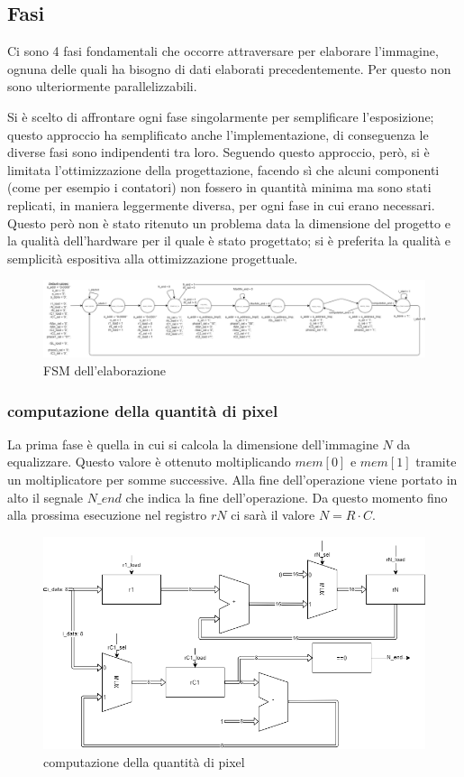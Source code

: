 \documentclass[11pt]{article} %
\begin{document}
\subsection{Fasi}
Ci sono 4 fasi fondamentali che occorre attraversare per elaborare l'immagine, ognuna delle quali ha bisogno di dati elaborati precedentemente. Per questo non sono ulteriormente parallelizzabili.

Si è scelto di affrontare ogni fase singolarmente per semplificare l'esposizione; questo approccio ha semplificato anche l'implementazione, di conseguenza le diverse fasi sono indipendenti tra loro. Seguendo questo approccio, però, si è limitata l'ottimizzazione della progettazione, facendo sì che alcuni componenti (come per esempio i contatori) non fossero in quantità minima ma sono stati replicati, in maniera leggermente diversa, per ogni fase in cui erano necessari. Questo però non è stato ritenuto un problema data la dimensione del progetto e la qualità dell'hardware per il quale è stato progettato; si è preferita la qualità e semplicità espositiva alla ottimizzazione progettuale.

\begin{figure}[h]
\centering
\includegraphics[width=150mm]{datapaths/FSM.png}
\caption{FSM dell'elaborazione}
\end{figure}

\subsubsection{computazione della quantità di pixel}
La prima fase è quella in cui si calcola la dimensione dell'immagine $N$ da equalizzare. Questo valore è ottenuto moltiplicando $mem[0]$ e $mem[1]$ tramite un moltiplicatore per somme successive. Alla fine dell'operazione viene portato in alto il segnale $N\_end$ che indica la fine dell'operazione. Da questo momento fino alla prossima esecuzione nel registro $rN$ ci sarà il valore $N = R \cdot C$.

\begin{figure}[h]
\centering
\includegraphics[width=120mm]{datapaths/regN.png}
\caption{computazione della quantità di pixel}
\end{figure}
\end{document}
